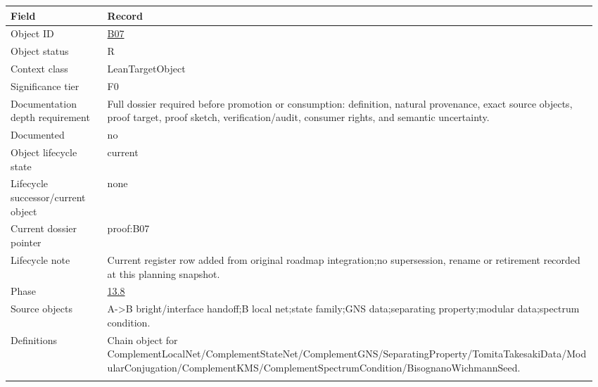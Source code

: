 \begin{longtable}{L{0.16\linewidth} L{0.81\linewidth}}
\hline
\textbf{Field} & \textbf{Record}\\
\hline
Object ID & \hyperlink{object-row-B07}{B07}\\
\hline\addlinespace[0.20em]
Object status & R\\
\hline\addlinespace[0.20em]
Context class & LeanTargetObject\\
\hline\addlinespace[0.20em]
Significance tier & F0\\
\hline\addlinespace[0.20em]
Documentation depth requirement & Full dossier required before promotion or consumption: definition, natural provenance, exact source objects, proof target, proof sketch, verification/\allowbreak{}audit, consumer rights, and semantic uncertainty.\\
\hline\addlinespace[0.20em]
Documented & no\\
\hline\addlinespace[0.20em]
Object lifecycle state & current\\
\hline\addlinespace[0.20em]
Lifecycle successor/\allowbreak{}current object & none\\
\hline\addlinespace[0.20em]
Current dossier pointer & proof:B07\\
\hline\addlinespace[0.20em]
Lifecycle note & Current register row added from original roadmap integration;\newline no supersession, rename or retirement recorded at this planning snapshot.\\
\hline\addlinespace[0.20em]
Phase & \hyperlink{phase-row-13-8}{13.8}\\
\hline\addlinespace[0.20em]
Source objects & A->B bright/\allowbreak{}interface handoff;\newline B local net;\newline state family;\newline GNS data;\newline separating property;\newline modular data;\newline spectrum condition.\\
\hline\addlinespace[0.20em]
Definitions & Chain object for ComplementLocalNet/\allowbreak{}ComplementStateNet/\allowbreak{}ComplementGNS/\allowbreak{}SeparatingProperty/\allowbreak{}TomitaTakesakiData/\allowbreak{}ModularConjugation/\allowbreak{}ComplementKMS/\allowbreak{}ComplementSpectrumCondition/\allowbreak{}BisognanoWichmannSeed.\\
\hline\addlinespace[0.20em]

\end{longtable}
